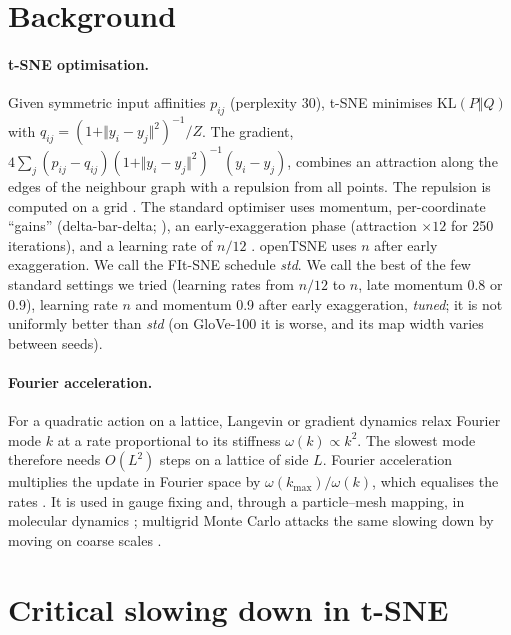 \documentclass[11pt]{article}
\begin{document}
\section{Background}
\paragraph{t-SNE optimisation.} Given symmetric input affinities $p_{ij}$ (perplexity 30), t-SNE minimises
$\mathrm{KL}(P\Vert Q)$ with $q_{ij}=(1+\Vert y_i-y_j\Vert^2)^{-1}/Z$. The gradient,
$4\sum_j (p_{ij}-q_{ij})(1+\Vert y_i-y_j\Vert^2)^{-1}(y_i-y_j)$, combines an attraction along the edges of the
neighbour graph with a repulsion from all points. The repulsion is computed on a grid
\citep{linderman2019fitsne,delchevalerie2021pm}. The standard optimiser uses momentum, per-coordinate
``gains'' (delta-bar-delta; \citealp{jacobs1988}), an early-exaggeration phase (attraction $\times12$ for 250 iterations), and a
learning rate of $n/12$ \citep{belkina2019,linderman2019fitsne}. openTSNE \citep{policar2024opentsne} uses
$n$ after early exaggeration. We call the FIt-SNE schedule \emph{std}. We call the best of the few standard settings
we tried (learning rates from $n/12$ to $n$, late momentum 0.8 or 0.9), learning rate $n$ and momentum 0.9 after
early exaggeration, \emph{tuned}; it is not uniformly better than \emph{std} (on GloVe-100 it is worse, and its map
width varies between seeds).

\paragraph{Fourier acceleration.} For a quadratic action on a lattice, Langevin or gradient dynamics relax
Fourier mode $k$ at a rate proportional to its stiffness $\omega(k)\propto k^2$. The slowest mode therefore
needs $O(L^2)$ steps on a lattice of side $L$. Fourier acceleration multiplies the update in Fourier space by
$\omega(k_{\max})/\omega(k)$, which equalises the rates \citep{batrouni1985}. It is used in gauge fixing
\citep{davies1988} and, through a particle--mesh mapping, in molecular dynamics
\citep{alexander2000}; multigrid Monte Carlo attacks the same slowing down by moving on coarse scales
\citep{goodman1986}.

\section{Critical slowing down in t-SNE}\label{sec:csd}
\end{document}
